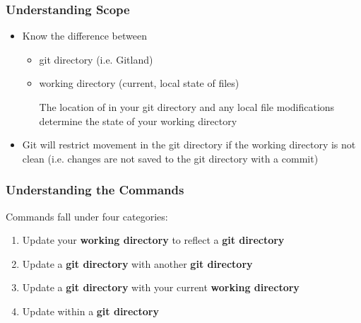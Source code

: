 \begin{frame}[c]\frametitle{Understanding Scope}

	\begin{itemize}
		\item Know the difference between
		\begin{itemize}
			\item git directory (i.e. Gitland)
			\item working directory (current, local state of files)

			The location of  in your git directory
			and any local file modifications determine the state
			of your working directory
		\end{itemize}
		\item Git will restrict movement in the git directory
		if the working directory is not clean (i.e. changes
		are not saved to the git directory
		with a commit)
	\end{itemize}
\end{frame}

\begin{frame}[t]\frametitle{Understanding the Commands}
		Commands fall under four categories:
		\begin{enumerate}
			\item Update your \textbf{working directory} to reflect
			a \textbf{git directory} 

			\vspace{0.3cm}
			
			\vspace{0.3cm}
			\item Update a \textbf{git directory} with another \textbf{git
			directory} 

			\vspace{0.3cm}
			
			\vspace{0.3cm}
			\item Update a \textbf{git directory} with your current
			\textbf{working directory} 

			\vspace{0.3cm}

			\vspace{0.3cm}
			\item Update within a \textbf{git directory} 

			\vspace{0.3cm}
		\end{enumerate}
\end{frame}

